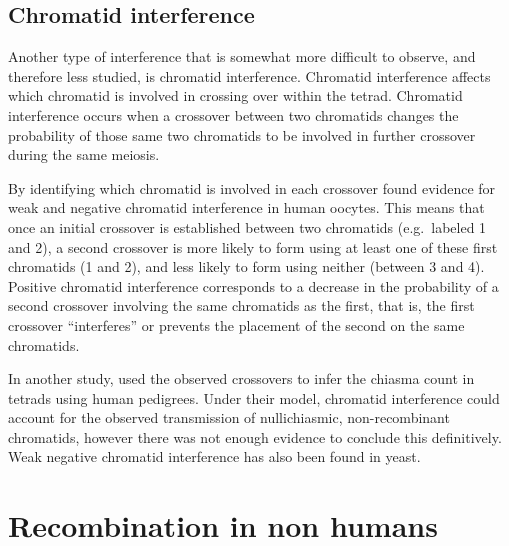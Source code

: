 \subsection{Chromatid interference}

Another type of interference that is somewhat more difficult to observe, and therefore less studied, is chromatid interference.
Chromatid interference affects which chromatid is involved in crossing over within the tetrad.
Chromatid interference occurs when a crossover between two chromatids changes the probability of those same two chromatids to be involved in further crossover during the same meiosis.

By identifying which chromatid is involved in each crossover \citet{Hou2013} found evidence for weak and negative chromatid interference in human oocytes.
This means that once an initial crossover is established between two chromatids (e.g.\ labeled 1 and 2), a second crossover is more likely to form using at least one of these first chromatids (1 and 2), and less likely to form using neither (between 3 and 4).
Positive chromatid interference corresponds to a decrease in the probability of a second crossover involving the same chromatids as the first, that is, the first crossover ``interferes'' or prevents the placement of the second on the same chromatids.

In another study, \citet{Fledel-Alon2009} used the observed crossovers to infer the chiasma count in tetrads using human pedigrees.
Under their model, chromatid interference could account for the observed transmission of nullichiasmic, non-recombinant chromatids, however there was not enough evidence to conclude this definitively.
Weak negative chromatid interference has also been found in yeast\cite{Zhao1995a}.





\section{Recombination in non humans}


